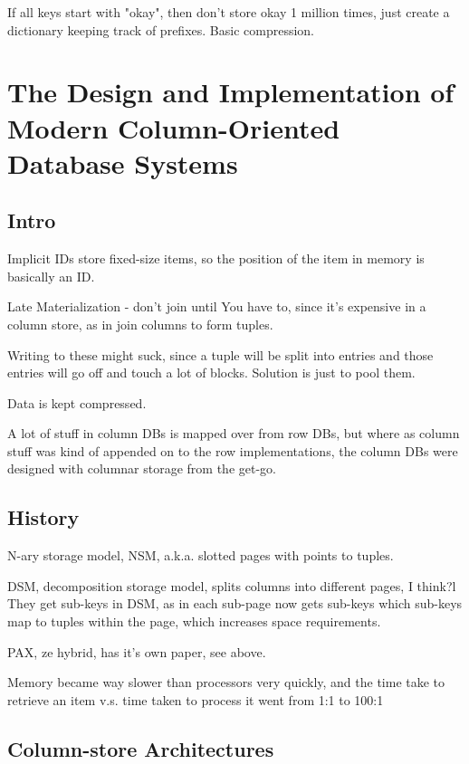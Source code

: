 \documentclass{article}
\begin{document}
		If all keys start with "okay", then don't store okay 1 million  times, just create a dictionary keeping track of prefixes. Basic compression.
		
\newpage
\section{The Design and Implementation of Modern Column-Oriented Database Systems}

	\subsection{Intro}
	
		Implicit IDs store fixed-size items, so the position of the item in memory is basically an ID.
		
		Late Materialization - don't join until You have to, since it's expensive in a column store, as in join columns to form tuples.
		
		Writing to these might suck, since a tuple will be split into entries and those entries will go off and touch a lot of blocks. Solution is just to pool them.
		
		Data is kept compressed.
		
		A lot of stuff in column DBs is mapped over from row DBs, but where as column stuff was kind of appended on to the row implementations, the column DBs were designed with columnar storage from the get-go.
		
	\subsection{History}
	
		N-ary storage model, NSM, a.k.a. slotted pages with points to tuples.
		
		DSM, decomposition storage model, splits columns into different pages, I think?l They get sub-keys in DSM, as in each sub-page now gets sub-keys which sub-keys map to tuples within the page, which increases space requirements.
		
		PAX, ze hybrid, has it's own paper, see above.
		
		Memory became way slower than processors very quickly, and the time take to retrieve an item v.s. time taken to process it went from 1:1 to 100:1
		
	
	\subsection{Column-store Architectures}
	
\end{document}
